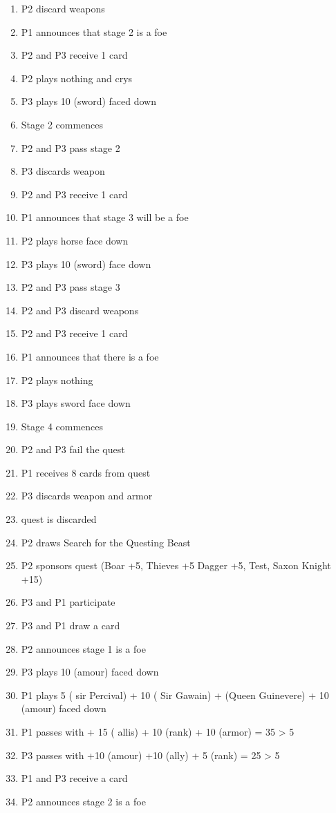 \documentclass[a4paper,11pt]{article}
\begin{document}
\begin{enumerate}
\item P2 discard weapons
\item P1 announces that stage 2 is a foe
\item P2 and P3 receive 1 card
\item P2 plays nothing and crys
\item P3 plays 10 (sword) faced down
\item Stage 2 commences 
\item P2 and P3 pass stage 2
\item P3 discards weapon
\item P2 and P3 receive 1 card
\item P1 announces that stage 3 will be a foe
\item P2 plays horse face down
\item P3 plays 10 (sword) face down 
\item P2 and P3 pass stage 3
\item P2 and P3 discard weapons
\item P2 and P3 receive 1 card
\item P1 announces that there is a foe
\item P2 plays nothing
\item P3 plays sword face down 
\item Stage 4 commences 
\item P2 and P3 fail the quest
\item P1 receives 8 cards from quest 
\item P3 discards weapon and armor
\item quest is discarded
\item P2 draws Search for the Questing Beast
\item P2 sponsors quest (Boar +5,  Thieves +5 Dagger +5,  Test,  Saxon Knight +15)
\item P3 and P1 participate
\item P3 and P1 draw a card
\item P2 announces stage 1 is a foe
\item P3 plays 10 (amour) faced down
\item P1 plays 5 ( sir Percival) + 10 ( Sir Gawain) + (Queen Guinevere) + 10 (amour) faced down
\item P1 passes with + 15 ( allis) + 10 (rank) + 10 (armor) = 35 > 5
\item P3 passes with +10 (amour) +10 (ally) + 5 (rank) = 25 > 5
\item P1 and P3 receive a card
\item P2 announces stage 2 is a foe

\end{enumerate}
\end{document}
